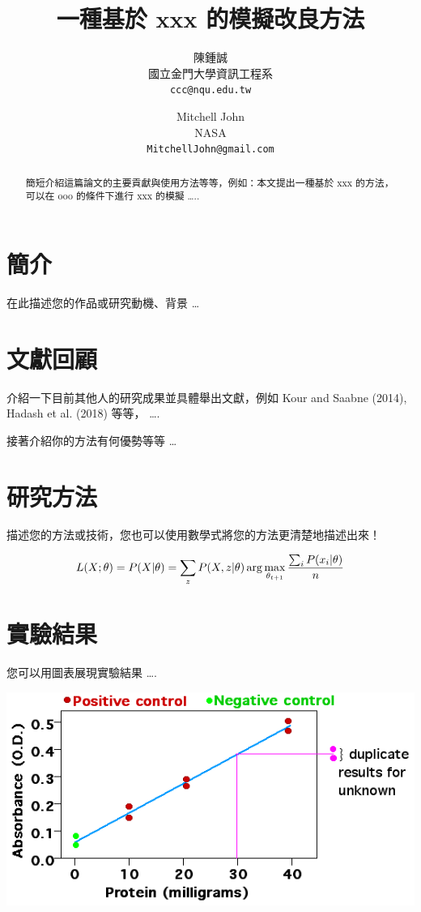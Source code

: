 \documentclass{article}
\title{一種基於 xxx 的模擬改良方法}
\author{
      陳鍾誠 \\
    國立金門大學資訊工程系 \\
    \texttt{ccc@nqu.edu.tw}
    \and
      Mitchell John \\
    NASA \\
    \texttt{MitchellJohn@gmail.com}
    \and
  }
\begin{document}
\maketitle

\begin{abstract}
  簡短介紹這篇論文的主要貢獻與使用方法等等，例如：本文提出一種基於 xxx
  的方法，可以在 ooo 的條件下進行 xxx 的模擬 \ldots..
\end{abstract}


\hypertarget{ux7c21ux4ecb}{%
\section{簡介}\label{ux7c21ux4ecb}}

在此描述您的作品或研究動機、背景 \ldots{}

\hypertarget{ux6587ux737bux56deux9867}{%
\section{文獻回顧}\label{ux6587ux737bux56deux9867}}

介紹一下目前其他人的研究成果並具體舉出文獻，例如 Kour and Saabne (2014),
Hadash et al. (2018) 等等， \ldots.

接著介紹你的方法有何優勢等等 \ldots{}

\hypertarget{ux7814ux7a76ux65b9ux6cd5}{%
\section{研究方法}\label{ux7814ux7a76ux65b9ux6cd5}}

描述您的方法或技術，您也可以使用數學式將您的方法更清楚地描述出來！

\[
L(X;\theta)=P(X|\theta)=\sum_z P(X,z|\theta) \\
\arg\max_{\theta_{t+1}} \frac{\sum_i P(x_i|\theta)}{n}\\
\]

\hypertarget{ux5be6ux9a57ux7d50ux679c}{%
\section{實驗結果}\label{ux5be6ux9a57ux7d50ux679c}}

您可以用圖表展現實驗結果 \ldots.

\includegraphics{img/curve.png}
\end{document}
